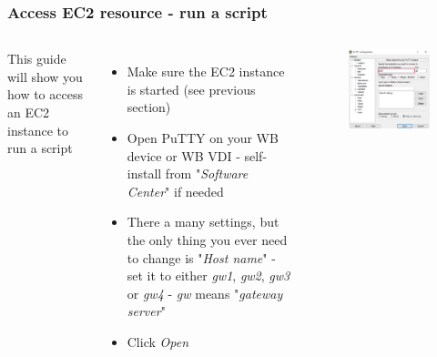 \documentclass[aspectratio=169]{beamer} %
\begin{document}
\begin{frame}
	\frametitle{Access EC2 resource - run a script}
	\begin{columns}[c]
		This guide will show you how to access an EC2 instance to run a script
		\begin{itemize}
			\item Make sure the EC2 instance is started (see previous section)
			\item Open PuTTY on your WB device or WB VDI - self-install from "\textit{Software Center}" if needed
			\item There a many settings, but the only thing you ever need to change is "\textit{Host name}" - set it to either \textit{gw1}, \textit{gw2}, \textit{gw3} or \textit{gw4} - \textit{gw} means "\textit{gateway server}"
			\item Click \textit{Open}
		\end{itemize}
		
		\begin{figure}
			\centering
			\includegraphics[width=\textwidth]{./img/access-1.png}
		\end{figure}
		
	\end{columns}
\end{frame}
\end{document}
